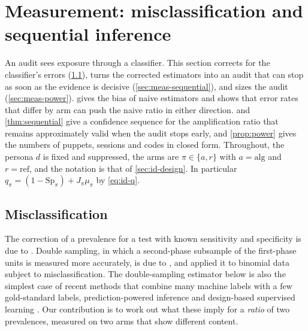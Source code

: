 \providecommand{\Se}{\mathrm{Se}}
\providecommand{\Sp}{\mathrm{Sp}}
\providecommand{\PPV}{\mathrm{PPV}}
\providecommand{\FOR}{\mathrm{FOR}}

\section{Measurement: misclassification and sequential inference}\label{sec:measurement}

An audit sees exposure through a classifier. This section corrects for the classifier's errors (\cref{sec:meas-misclass}), turns the corrected estimators into an audit that can stop as soon as the evidence is decisive (\cref{sec:meas-sequential}), and sizes the audit (\cref{sec:meas-power}).  gives the bias of naive estimators and shows that error rates that differ by arm can push the naive ratio in either direction.  and \cref{thm:sequential} give a confidence sequence for the amplification ratio that remains approximately valid when the audit stops early, and \cref{prop:power} gives the numbers of puppets, sessions and codes in closed form. Throughout, the persona $d$ is fixed and suppressed, the arms are $\pi\in\{a,r\}$ with $a=\mathrm{alg}$ and $r=\mathrm{ref}$, and the notation is that of \cref{sec:id-design}. In particular $q_\pi=(1-\Sp_\pi)+J_\pi\mu_\pi$ by \eqref{eq:id-q}.

\subsection{Misclassification}\label{sec:meas-misclass}

The correction of a prevalence for a test with known sensitivity and specificity is due to \citet{rogangladen1978}. Double sampling, in which a second-phase subsample of the first-phase units is measured more accurately, is due to \citet{neyman1938}, and \citet{tenenbein1970} applied it to binomial data subject to misclassification. The double-sampling estimator below is also the simplest case of recent methods that combine many machine labels with a few gold-standard labels, prediction-powered inference \citep{angelopoulos2023} and design-based supervised learning \citep{egami2023}. Our contribution is to work out what these imply for a \emph{ratio} of two prevalences, measured on two arms that show different content.

